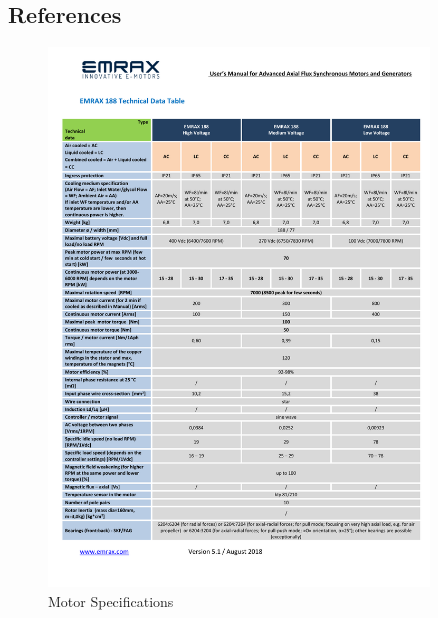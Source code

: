 \subsection{References}

\begin{figure}[H]
\centering
\includegraphics[width=0.9\textwidth]{texfiles/mech/eimg/propulsion/table_motor}
\caption{Motor Specifications}
\label{tab: Motor Specifications}
\end{figure}
 \newpage

